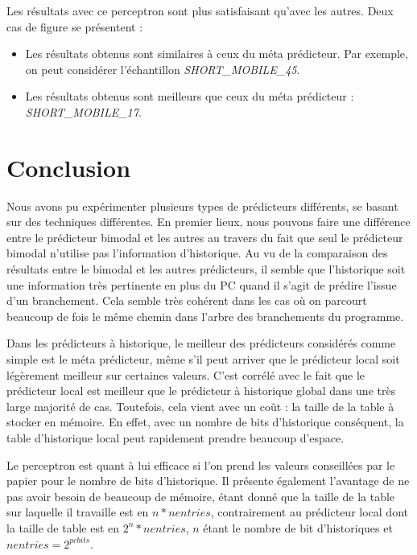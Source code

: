\documentclass{article}
\begin{document}
Les résultats avec ce perceptron sont plus satisfaisant qu'avec les autres. Deux cas de figure se présentent :
\begin{itemize}
    \item Les résultats obtenus sont similaires à ceux du méta prédicteur. Par exemple, on peut considérer l'échantillon \textit{SHORT\_MOBILE\_45}.
    \item Les résultats obtenus sont meilleurs que ceux du méta prédicteur : \textit{SHORT\_MOBILE\_17}.
\end{itemize}
\newpage

\section{Conclusion}

Nous avons pu expérimenter plusieurs types de prédicteurs différents, se basant sur des techniques différentes. En premier lieux, nous pouvons faire une différence entre le prédicteur bimodal et les autres au travers du fait que seul le prédicteur bimodal n'utilise pas l'information d'historique. Au vu de la comparaison des résultats entre le bimodal et les autres prédicteurs, il semble que l'historique soit une information très pertinente en plus du PC quand il s'agit de prédire l'issue d'un branchement. Cela semble très cohérent dans les cas où on parcourt beaucoup de fois le même chemin dans l'arbre des branchements du programme.


Dans les prédicteurs à historique, le meilleur des prédicteurs considérés comme simple est le méta prédicteur, même s'il peut arriver que le prédicteur local soit légèrement meilleur sur certaines valeurs. C'est corrélé avec le fait que le prédicteur local est meilleur que le prédicteur à historique global dans une très large majorité de cas. Toutefois, cela vient avec un coût : la taille de la table à stocker en mémoire. En effet, avec un nombre de bits d'historique conséquent, la table d'historique local peut rapidement prendre beaucoup d'espace.

Le perceptron est quant à lui efficace si l'on prend les valeurs conseillées par le papier pour le nombre de bits d'historique. Il présente également l'avantage de ne pas avoir besoin de beaucoup de mémoire, étant donné que la taille de la table sur laquelle il travaille est en $n*nentries$, contrairement au prédicteur local dont la taille de table est en $2^{n}*nentries$, $n$ étant le nombre de bit d'historiques et $nentries = 2^{pcbits}$.
\end{document}
